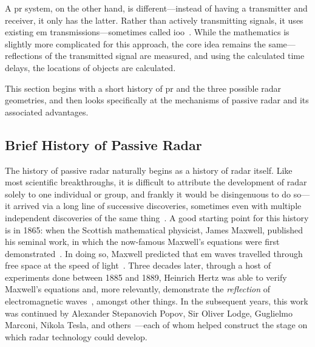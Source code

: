 \documentclass[class=report,11pt,crop=false]{standalone}
\begin{document}
A \gls{pr} system, on the other hand, is different---instead of having a transmitter and receiver, it only has the latter. Rather than actively transmitting signals, it uses existing \gls{em} transmissions---sometimes called \gls{ioo}~\cite{Griffiths1992}. While the mathematics is slightly more complicated for this approach, the core idea remains the same---reflections of the transmitted signal are measured, and using the calculated time delays, the locations of objects are calculated.

This section begins with a short history of \gls{pr} and the three possible radar geometries, and then looks specifically at the mechanisms of passive radar and its associated advantages.

\subsection{Brief History of Passive Radar}
The history of passive radar naturally begins as a history of radar itself. Like most scientific breakthroughs, it is difficult to attribute the development of radar solely to one individual or group, and frankly it would be disingenuous to do so---it arrived via a long line of successive discoveries, sometimes even with multiple independent discoveries of the same thing~\cite{brown1999technical}. A good starting point for this history is in 1865: when the Scottish mathematical physicist, James Maxwell, published his seminal work, in which the now-famous Maxwell's equations were first demonstrated~\cite{maxwell1865viii}. In doing so, Maxwell predicted that \gls{em} waves travelled through free space at the speed of light~\cite{Sengupta2003}. Three decades later, through a host of experiments done between 1885 and 1889, Heinrich Hertz was able to verify Maxwell's equations and, more relevantly, demonstrate the \emph{reflection} of electromagnetic waves~\cite{hertz1893electromagnetic, Cichon1995}, amongst other things. In the subsequent years, this work was continued by Alexander Stepanovich Popov, Sir Oliver Lodge, Guglielmo Marconi, Nikola Tesla, and others~\cite{Rohling2014, James1989, Griffiths2019}---each of whom helped construct the stage on which radar technology could develop.
\end{document}
